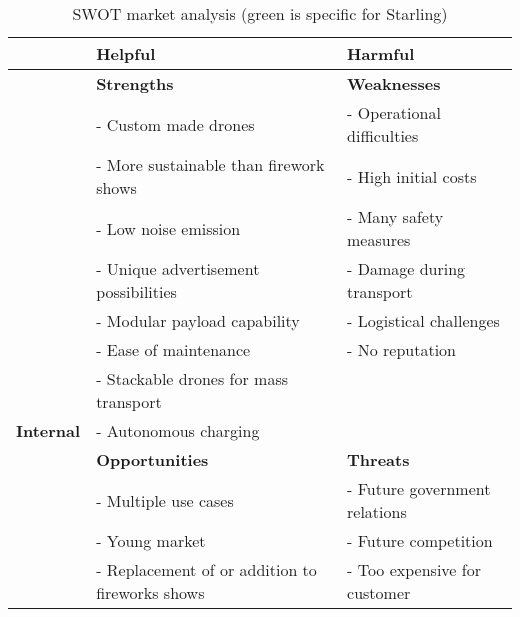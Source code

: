 \begin{table}[h]
\centering
\caption{SWOT market analysis (green is specific for Starling)}
\label{tab:SWOTmarket}
\begin{small}
\begin{tabular}{|c|l|l|}
\hline
\multicolumn{1}{|l|}{}     & \multicolumn{1}{l|}{\textbf{Helpful}}                      & \multicolumn{1}{l|}{\textbf{Harmful}}                \\ \hline
                           & \cellcolor[HTML]{acec97}\textbf{Strengths}        & \cellcolor[HTML]{ffb6b3}\textbf{Weaknesses} \\ \cline{2-3}
                           & - Custom made drones                                & - Operational difficulties                    \\
                           & - More sustainable than firework shows              & - High initial costs                          \\
                           & - Low noise emission                                        & - Many safety measures                        \\
                           & - Unique advertisement possibilities                                        &  - Damage during transport                       \\
                           & {\color[HTML]{036400} - Modular payload capability} &      - Logistical challenges                \\ 
                           & {\color[HTML]{036400} - Ease of maintenance} &         {\color[HTML]{036400} - No reputation}            \\ 
                & {\color[HTML]{036400} - Stackable drones for mass transport} & \\
\multirow{-9}{*}{\textbf{Internal}} & {\color[HTML]{036400} - Autonomous charging}        &       \\ \hline
                           & \cellcolor[HTML]{acec97}\textbf{Opportunities}    & \cellcolor[HTML]{ffb6b3}\textbf{Threats}    \\ \cline{2-3}
                           & - Multiple use cases                                & - Future government relations                 \\
                           & - Young market                                      & - Future competition                          \\
                           & - Replacement of or addition to fireworks shows                    & - Too expensive for customer                  \\

\end{tabular}
\end{small}
\end{table}
